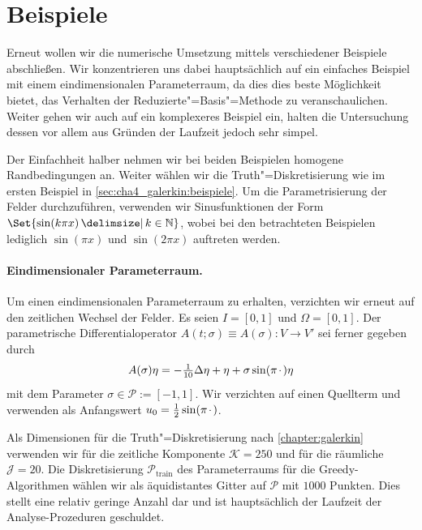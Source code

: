 \documentclass[../main.tex]{subfiles}
\begin{document}
\section{Beispiele} %
\label{sec:cha5_rbm:beispiele}

Erneut wollen wir die numerische Umsetzung mittels verschiedener Beispiele abschließen.
Wir konzentrieren uns dabei hauptsächlich auf ein einfaches Beispiel mit einem eindimensionalen Parameterraum, da dies dies beste Möglichkeit bietet, das Verhalten der Reduzierte"=Basis"=Methode zu veranschaulichen.
Weiter gehen wir auch auf ein komplexeres Beispiel ein, halten die Untersuchung dessen vor allem aus Gründen der Laufzeit jedoch sehr simpel.

Der Einfachheit halber nehmen wir bei beiden Beispielen homogene Randbedingungen an.
Weiter wählen wir die Truth"=Diskretisierung wie im ersten Beispiel in \cref{sec:cha4_galerkin:beispiele}.
Um die Parametrisierung der Felder durchzuführen, verwenden wir Sinusfunktionen der Form $\Set{\sin(k \pi x) \given k \in \mathbb{N}}$, wobei bei den betrachteten Beispielen lediglich $\sin(\pi x)$ und $\sin(2 \pi x)$ auftreten werden.

\paragraph{Eindimensionaler Parameterraum.} %

Um einen eindimensionalen Parameterraum zu erhalten, verzichten wir erneut auf den zeitlichen Wechsel der Felder.
Es seien $I = [0, 1]$ und $\Omega = [0, 1]$.
Der parametrische Differentialoperator $A(t; \sigma) \equiv A(\sigma) \colon V \to V'$ sei ferner gegeben durch
\begin{equation}
    A(\sigma) \eta = - \tfrac{1}{10} \Delta \eta + \eta + \sigma \sin(\pi {\mkern2mu\cdot\mkern2mu}) \eta
\end{equation}
mit dem Parameter $\sigma \in \mathcal P := [-1, 1]$.
Wir verzichten auf einen Quellterm und verwenden als Anfangswert $u_{0} = \tfrac{1}{2} \sin(\pi {\mkern2mu\cdot\mkern2mu})$.

Als Dimensionen für die Truth"=Diskretisierung nach \cref{chapter:galerkin} verwenden wir für die zeitliche Komponente $\mathcal K = 250$ und für die räumliche $\mathcal J = 20$.
Die Diskretisierung $\mathcal P_{\mathrm{train}}$ des Parameterraums für die Greedy-Algorithmen wählen wir als äquidistantes Gitter auf $\mathcal P$ mit $1000$ Punkten.
Dies stellt eine relativ geringe Anzahl dar und ist hauptsächlich der Laufzeit der Analyse-Prozeduren geschuldet.
\end{document}
